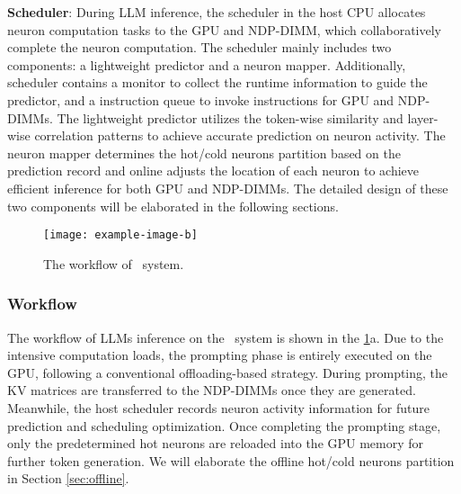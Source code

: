 \textbf{Scheduler}:
During LLM inference, the scheduler in the host CPU allocates neuron computation tasks to the GPU and NDP-DIMM, which collaboratively complete the neuron computation. The scheduler mainly includes two components: a lightweight predictor and a neuron mapper. Additionally, scheduler contains a monitor to collect the runtime information to guide the predictor, and a instruction queue to invoke instructions for GPU and NDP-DIMMs. The lightweight predictor utilizes the token-wise similarity and layer-wise correlation patterns to achieve accurate prediction on neuron activity. The neuron mapper determines the hot/cold neurons partition based on the prediction record and online adjusts the location of each neuron to achieve efficient inference for both GPU and NDP-DIMMs. The detailed design of these two components will be elaborated in the following sections.

\begin{figure}[t]
    \centering
    \texttt{[image: example-image-b]}
    \caption{The workflow of \name~system.}
    \label{fig:workflow}
\end{figure}

\subsubsection{Workflow}
The workflow of LLMs inference on the \name~system is shown in the \fig \ref{fig:workflow}a. Due to the intensive computation loads, the prompting phase is entirely executed on the GPU, following a conventional offloading-based strategy. During prompting, the KV matrices are transferred to the NDP-DIMMs once they are generated. Meanwhile, the host scheduler records neuron activity information for future prediction and scheduling optimization. Once completing the prompting stage, only the predetermined hot neurons are reloaded into the GPU memory for further token generation. We will elaborate the offline hot/cold neurons partition in Section \ref{sec:offline}.

